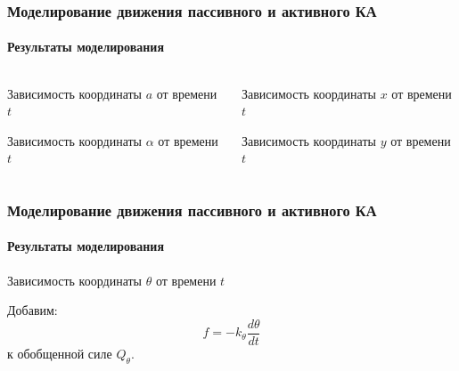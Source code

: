 \documentclass[10pt,pdf,hyperref={unicode}]{beamer}
\begin{document}
\begin{frame}
\frametitle{Моделирование движения пассивного и активного КА}
\framesubtitle{Результаты моделирования}
\begin{columns}[onlytextwidth]
	\begin{column}{0.5\textwidth}
		\begin{figure}[H]
		\end{figure}
		\scriptsize{Зависимость координаты $a$ от времени $t$}
		\begin{figure}[H]
		\end{figure} 
		\scriptsize{Зависимость координаты $\alpha$ от времени $t$}
	\end{column}
	\begin{column}{0.5\textwidth}
		\begin{figure}[H]
		\end{figure} 
		\scriptsize{Зависимость координаты $x$ от времени $t$}
		\begin{figure}[H]
		\end{figure} 
		\scriptsize{Зависимость координаты $y$ от времени $t$}
	\end{column}
\end{columns}
\end{frame}
\begin{frame}
\frametitle{Моделирование движения пассивного и активного КА}
\framesubtitle{Результаты моделирования}
	\begin{figure}[H]
	\end{figure} 
	\begin{center}\scriptsize{Зависимость координаты $\theta$ от времени $t$}\end{center}
	Добавим:
	\begin{equation*}
		f = - k_\theta \frac{d\theta}{dt}
	\end{equation*}
	к обобщенной силе $Q_\theta$.
\end{frame}
\end{document}
